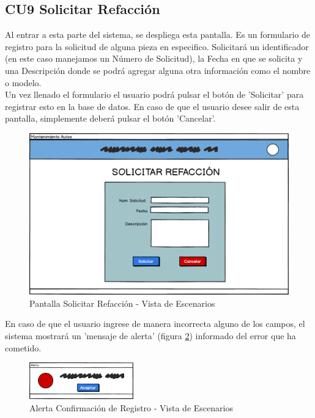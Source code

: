 \subsection{CU9 Solicitar Refacción}
Al entrar a esta parte del sistema, se despliega esta pantalla. Es un formulario de registro para la solicitud de alguna pieza en especifico. Solicitará un identificador (en este caso manejamos un Número de Solicitud), la Fecha en que se solicita y una Descripción donde se podrá agregar alguna otra información como el nombre o modelo. 
\\
Un vez llenado el formulario el usuario podrá pulsar el botón de 'Solicitar' para registrar esto en la base de datos. En caso de que el usuario desee salir de esta pantalla, simplemente deberá pulsar el botón 'Cancelar'.
\begin{figure}[!h]
	\centering
	\includegraphics[width=1\textwidth]{./diseno/vescenarios/imagenes/solicitarRefaccion}
	\caption{Pantalla Solicitar Refacción - Vista de Escenarios}
	\label{fig:Pantalla Solicitar Refaccion - Vista de Escenarios}
\end{figure}
En caso de que el usuario ingrese de manera incorrecta alguno de los campos, el sistema mostrará un 'mensaje de alerta' (figura \ref{fig:Alerta5 - Vista de Escenarios}) informado del error que ha cometido. 
\begin{figure}[!h]
	\centering
	\includegraphics[width=0.4\textwidth]{./diseno/vescenarios/imagenes/alerta}
	\caption{Alerta Confirmación de Registro - Vista de Escenarios}
	\label{fig:Alerta5 - Vista de Escenarios}
\end{figure}